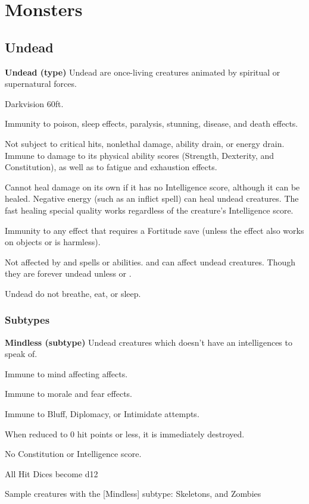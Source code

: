 \chapter{Monsters}

\section{Undead}

\textbf{Undead (type)}
Undead are once-living creatures animated by spiritual or supernatural forces.
\begin{itemize*}
\item Darkvision 60ft.
\item Immunity to poison, sleep effects, paralysis, stunning, disease, and death effects.
\item Not subject to critical hits, nonlethal damage, ability drain, or energy drain. Immune to damage to its physical ability scores (Strength, Dexterity, and Constitution), as well as to fatigue and exhaustion effects.
\item Cannot heal damage on its own if it has no Intelligence score, although it can be healed. Negative energy (such as an inflict spell) can heal undead creatures. The fast healing special quality works regardless of the creature’s Intelligence score.
\item Immunity to any effect that requires a Fortitude save (unless the effect also works on objects or is harmless).
\item Not affected by  and  spells or abilities.  and  can affect undead creatures. Though they are forever undead unless  or .
\item Undead do not breathe, eat, or sleep.
\end{itemize*}

\subsection{Subtypes}

\textbf{Mindless (subtype)}
Undead creatures which doesn't have an intelligences to speak of.
\begin{itemize*}
\item Immune to mind affecting affects.
\item Immune to morale and fear effects.
\item Immune to  Bluff, Diplomacy, or Intimidate attempts.
\item When reduced to 0 hit points or less, it is immediately destroyed.
\item No Constitution or Intelligence score.
\item All Hit Dices become d12
\item Sample creatures with the [Mindless] subtype: Skeletons, and Zombies
\end{itemize*}


